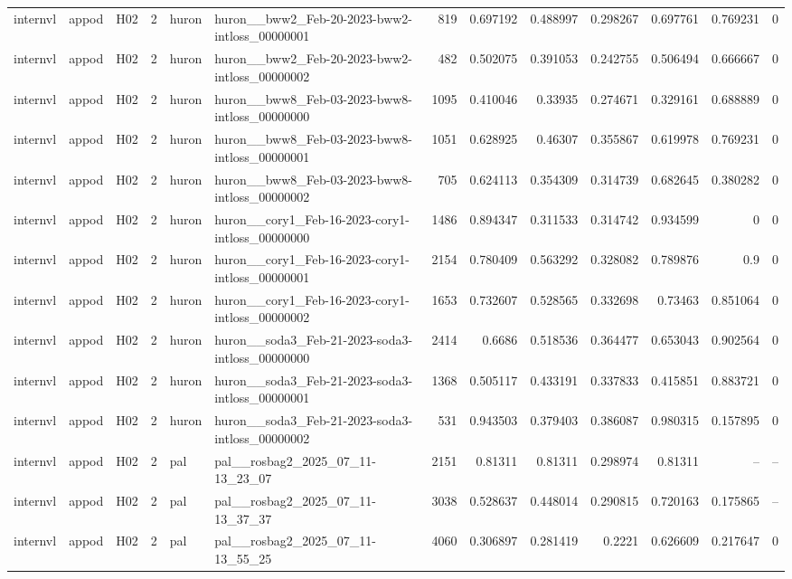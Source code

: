 \begin{longtable}{lllrllrrrrrrr}
internvl & appod & H02 & 2 & huron & huron\_\_bww2\_Feb-20-2023-bww2-intloss\_00000001 & 819 & 0.697192 & 0.488997 & 0.298267 & 0.697761 & 0.769231 & 0 \\
internvl & appod & H02 & 2 & huron & huron\_\_bww2\_Feb-20-2023-bww2-intloss\_00000002 & 482 & 0.502075 & 0.391053 & 0.242755 & 0.506494 & 0.666667 & 0 \\
internvl & appod & H02 & 2 & huron & huron\_\_bww8\_Feb-03-2023-bww8-intloss\_00000000 & 1095 & 0.410046 & 0.33935 & 0.274671 & 0.329161 & 0.688889 & 0 \\
internvl & appod & H02 & 2 & huron & huron\_\_bww8\_Feb-03-2023-bww8-intloss\_00000001 & 1051 & 0.628925 & 0.46307 & 0.355867 & 0.619978 & 0.769231 & 0 \\
internvl & appod & H02 & 2 & huron & huron\_\_bww8\_Feb-03-2023-bww8-intloss\_00000002 & 705 & 0.624113 & 0.354309 & 0.314739 & 0.682645 & 0.380282 & 0 \\
internvl & appod & H02 & 2 & huron & huron\_\_cory1\_Feb-16-2023-cory1-intloss\_00000000 & 1486 & 0.894347 & 0.311533 & 0.314742 & 0.934599 & 0 & 0 \\
internvl & appod & H02 & 2 & huron & huron\_\_cory1\_Feb-16-2023-cory1-intloss\_00000001 & 2154 & 0.780409 & 0.563292 & 0.328082 & 0.789876 & 0.9 & 0 \\
internvl & appod & H02 & 2 & huron & huron\_\_cory1\_Feb-16-2023-cory1-intloss\_00000002 & 1653 & 0.732607 & 0.528565 & 0.332698 & 0.73463 & 0.851064 & 0 \\
internvl & appod & H02 & 2 & huron & huron\_\_soda3\_Feb-21-2023-soda3-intloss\_00000000 & 2414 & 0.6686 & 0.518536 & 0.364477 & 0.653043 & 0.902564 & 0 \\
internvl & appod & H02 & 2 & huron & huron\_\_soda3\_Feb-21-2023-soda3-intloss\_00000001 & 1368 & 0.505117 & 0.433191 & 0.337833 & 0.415851 & 0.883721 & 0 \\
internvl & appod & H02 & 2 & huron & huron\_\_soda3\_Feb-21-2023-soda3-intloss\_00000002 & 531 & 0.943503 & 0.379403 & 0.386087 & 0.980315 & 0.157895 & 0 \\
internvl & appod & H02 & 2 & pal & pal\_\_rosbag2\_2025\_07\_11-13\_23\_07 & 2151 & 0.81311 & 0.81311 & 0.298974 & 0.81311 & -- & -- \\
internvl & appod & H02 & 2 & pal & pal\_\_rosbag2\_2025\_07\_11-13\_37\_37 & 3038 & 0.528637 & 0.448014 & 0.290815 & 0.720163 & 0.175865 & -- \\
internvl & appod & H02 & 2 & pal & pal\_\_rosbag2\_2025\_07\_11-13\_55\_25 & 4060 & 0.306897 & 0.281419 & 0.2221 & 0.626609 & 0.217647 & 0 \\

\end{longtable}
